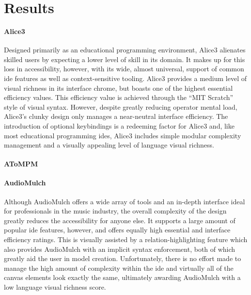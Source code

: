 \section{Results}
\label{sec:results}


\paragraph{Alice3} Designed primarily as an educational programming
environment, Alice3 alienates skilled users by expecting a lower level of
skill in its domain. It makes up for this loss in accessibility, however,
with its wide, almost universal, support of common \ac{ide} features as
well as context-sensitive tooling. Alice3 provides a medium level of visual
richness in its interface chrome, but boasts one of the highest essential
efficiency values. This efficiency value is achieved through the ``MIT
Scratch'' style of visual syntax. However, despite greatly reducing
operator mental load, Alice3's clunky design only manages a near-neutral
interface efficiency. The introduction of optional keybindings is a
redeeming factor for Alice3 and, like most educational programming
\acp{ide}, Alice3 includes simple modular complexity management and a
visually appealing level of language visual richness.

\paragraph{AToMPM}

\paragraph{AudioMulch} Although AudioMulch offers a wide array of tools and
an in-depth interface ideal for professionals in the music industry, the
overall complexity of the design greatly reduces the accessibility for
anyone else. It supports a large amount of popular \ac{ide} features,
however, and offers equally high essential and interface efficiency
ratings. This is visually assisted by a relation-highlighting feature
which also provides AudioMulch with an implicit syntax enforcement, both of
which greatly aid the user in model creation. Unfortunately, there is no
effort made to manage the high amount of complexity within the \ac{ide} and
virtually all of the canvas elements look exactly the same, ultimately
awarding AudioMulch with a low language visual richness score.


